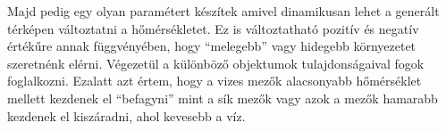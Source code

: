 \noindent Majd pedig egy olyan paramétert készítek amivel dinamikusan lehet a generált térképen változtatni a hőmérsékletet. Ez is változtatható pozitív és negatív értékűre annak függvényében, hogy “melegebb” vagy hidegebb környezetet szeretnénk elérni.
\newline
\newline Végezetül a különböző objektumok tulajdonságaival fogok foglalkozni. Ezalatt azt értem, hogy a vizes mezők alacsonyabb hőmérséklet mellett kezdenek el “befagyni” mint a sík mezők vagy azok a mezők hamarabb kezdenek el kiszáradni, ahol kevesebb a víz.


